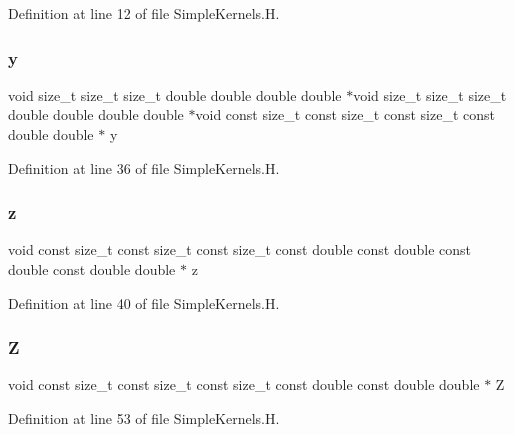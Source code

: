 Definition at line 12 of file Simple\+Kernels.\+H.

\hypertarget{SimpleKernels_8H_adbbc84da22c830df0837e7f82eff48d8}{}\label{SimpleKernels_8H_adbbc84da22c830df0837e7f82eff48d8} 
\subsubsection{\texorpdfstring{y}{y}}
{\footnotesize\ttfamily void size\+\_\+t size\+\_\+t size\+\_\+t double double double double $\ast$void size\+\_\+t size\+\_\+t size\+\_\+t double double double double $\ast$void const size\+\_\+t const size\+\_\+t const size\+\_\+t const double double $\ast$ y}



Definition at line 36 of file Simple\+Kernels.\+H.

\hypertarget{SimpleKernels_8H_adb2aee3e07debafe3268a02ecabbd911}{}\label{SimpleKernels_8H_adb2aee3e07debafe3268a02ecabbd911} 
\subsubsection{\texorpdfstring{z}{z}}
{\footnotesize\ttfamily void const size\+\_\+t const size\+\_\+t const size\+\_\+t const double const double const double const double double $\ast$ z}



Definition at line 40 of file Simple\+Kernels.\+H.

\hypertarget{SimpleKernels_8H_a410f84f11232fb55b68c2948b8caf50b}{}\label{SimpleKernels_8H_a410f84f11232fb55b68c2948b8caf50b} 
\subsubsection{\texorpdfstring{Z}{Z}}
{\footnotesize\ttfamily void const size\+\_\+t const size\+\_\+t const size\+\_\+t const double const double double $\ast$ Z}



Definition at line 53 of file Simple\+Kernels.\+H.

